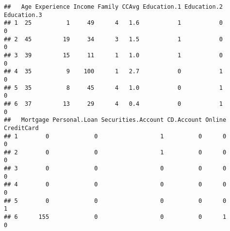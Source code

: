\documentclass[
]{article}
\newenvironment{Shaded}{\begin{snugshade}}{\end{snugshade}}
\newcommand{\AttributeTok}[1]{\textcolor[rgb]{0.77,0.63,0.00}{#1}}
\newcommand{\FunctionTok}[1]{\textcolor[rgb]{0.00,0.00,0.00}{#1}}
\newcommand{\NormalTok}[1]{#1}
\newcommand{\OtherTok}[1]{\textcolor[rgb]{0.56,0.35,0.01}{#1}}
\newcommand{\SpecialCharTok}[1]{\textcolor[rgb]{0.00,0.00,0.00}{#1}}
\begin{document}
\begin{verbatim}
##   Age Experience Income Family CCAvg Education.1 Education.2 Education.3
## 1  25          1     49      4   1.6           1           0           0
## 2  45         19     34      3   1.5           1           0           0
## 3  39         15     11      1   1.0           1           0           0
## 4  35          9    100      1   2.7           0           1           0
## 5  35          8     45      4   1.0           0           1           0
## 6  37         13     29      4   0.4           0           1           0
##   Mortgage Personal.Loan Securities.Account CD.Account Online CreditCard
## 1        0             0                  1          0      0          0
## 2        0             0                  1          0      0          0
## 3        0             0                  0          0      0          0
## 4        0             0                  0          0      0          0
## 5        0             0                  0          0      0          1
## 6      155             0                  0          0      1          0
\end{verbatim}

\begin{Shaded}
\end{Shaded}
\end{document}
